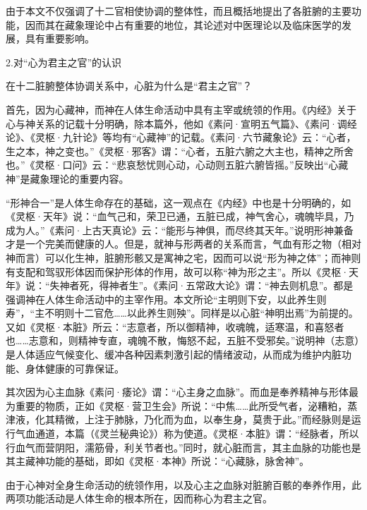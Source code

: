 \documentclass[12pt]{ctexbook}
\begin{document}
由于本文不仅强调了十二官相使协调的整体性，而且概括地提出了各脏腑的主要功能，因而其在藏象理论中占有重要的地位，其论述对中医理论以及临床医学的发展，具有重要影响。

2.对“心为君主之官”的认识

在十二脏腑整体协调关系中，心脏为什么是“君主之官”？

首先，因为心藏神，而神在人体生命活动中具有主宰或统领的作用。《内经》关于心与神关系的记载十分明确，除本篇外，他如《素问·宣明五气篇》、《素问·调经论》、《灵枢·九针论》等均有“心藏神”的记载。《素问·六节藏象论》云：“心者，生之本，神之变也。”《灵枢·邪客》谓：“心者，五脏六腑之大主也，精神之所舍也。”《灵枢·口问》云：“悲哀愁忧则心动，心动则五脏六腑皆摇。”反映出“心藏神”是藏象理论的重要内容。

“形神合一”是人体生命存在的基础，这一观点在《内经》中也是十分明确的，如《灵枢·天年》说：“血气己和，荣卫已通，五脏已成，神气舍心，魂魄毕具，乃成为人。”《素问·上古天真论》云：“能形与神俱，而尽终其天年。”说明形神兼备才是一个完美而健康的人。但是，就神与形两者的关系而言，气血有形之物（相对神而言）可以化生神，脏腑形骸又是寓神之宅，因而可以说“形为神之体”；而神则有支配和驾驭形体因而保护形体的作用，故可以称“神为形之主”。所以《灵枢·天年》说：“失神者死，得神者生”。《素问·五常政大论》谓：“神去则机息”。都是强调神在人体生命活动中的主宰作用。本文所论“主明则下安，以此养生则寿”，“主不明则十二官危……以此养生则殃”。同样是以心脏“神明出焉”为前提的。又如《灵枢·本脏》所云：“志意者，所以御精神，收魂魄，适寒温，和喜怒者也……志意和，则精神专直，魂魄不散，悔怒不起，五脏不受邪矣。”说明神（志意）是人体适应气候变化、缓冲各种因素刺激引起的情绪波动，从而成为维护内脏功能、身体健康的可靠保证。

其次因为心主血脉《素问·痿论》谓：“心主身之血脉”。而血是奉养精神与形体最为重要的物质，正如《灵枢·营卫生会》所说：“中焦……此所受气者，泌糟粕，蒸津液，化其精微，上注于肺脉，乃化而为血，以奉生身，莫贵于此。”而经脉则是运行气血通道，本篇（《灵兰秘典论》）称为使道。《灵枢·本脏》谓：“经脉者，所以行血气而营阴阳，濡筋骨，利关节者也。”同时，就心脏而言，其主血脉的功能也是其主藏神功能的基础，即如《灵枢·本神》所说：“心藏脉，脉舍神”。

由于心神对全身生命活动的统领作用，以及心主之血脉对脏腑百骸的奉养作用，此两项功能活动是人体生命的根本所在，因而称心为君主之官。


\end{document}

